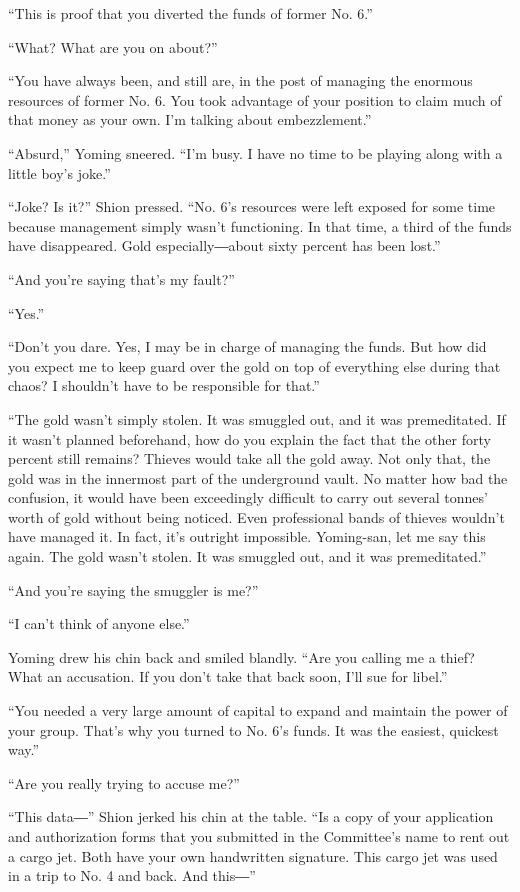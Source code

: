 ``This is proof that you diverted the funds of former No. 6.''

``What? What are you on about?''

``You have always been, and still are, in the post of managing the
enormous resources of former No. 6. You took advantage of your position
to claim much of that money as your own. I'm talking about
embezzlement.''

``Absurd,'' Yoming sneered. ``I'm busy. I have no time to be playing
along with a little boy's joke.''

``Joke? Is it?'' Shion pressed. ``No. 6's resources were left exposed
for some time because management simply wasn't functioning. In that
time, a third of the funds have disappeared. Gold especially―about sixty
percent has been lost.''

``And you're saying that's my fault?''

``Yes.''

``Don't you dare. Yes, I may be in charge of managing the funds. But how
did you expect me to keep guard over the gold on top of everything else
during that chaos? I shouldn't have to be responsible for that.''

``The gold wasn't simply stolen. It was smuggled out, and it was
premeditated. If it wasn't planned beforehand, how do you explain the
fact that the other forty percent still remains? Thieves would take all
the gold away. Not only that, the gold was in the innermost part of the
underground vault. No matter how bad the confusion, it would have been
exceedingly difficult to carry out several tonnes' worth of gold without
being noticed. Even professional bands of thieves wouldn't have managed
it. In fact, it's outright impossible. Yoming-san, let me say this
again. The gold wasn't stolen. It was smuggled out, and it was
premeditated.''

``And you're saying the smuggler is me?''

``I can't think of anyone else.''

Yoming drew his chin back and smiled blandly. ``Are you calling me a
thief? What an accusation. If you don't take that back soon, I'll sue
for libel.''

``You needed a very large amount of capital to expand and maintain the
power of your group. That's why you turned to No. 6's funds. It was the
easiest, quickest way.''

``Are you really trying to accuse me?''

``This data―'' Shion jerked his chin at the table. ``Is a copy of your
application and authorization forms that you submitted in the
Committee's name to rent out a cargo jet. Both have your own handwritten
signature. This cargo jet was used in a trip to No. 4 and back. And
this―''


